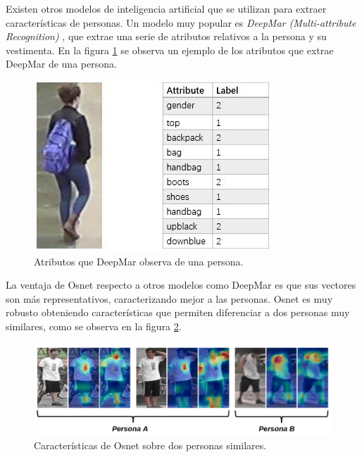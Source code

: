 
\newpage

Existen otros modelos de inteligencia artificial que se utilizan para extraer características de personas. Un modelo muy popular es \textit{DeepMar (Multi-attribute Recognition)} \citep{DEEPMAR}, que extrae una serie de atributos relativos a la persona y su vestimenta. En la figura \ref{fig:deepmar} se observa un ejemplo de los atributos que extrae DeepMar de una persona.

\begin{figure}[ht]
	\centering
	\includegraphics[scale=.8]{./Figures/deepmar.png}
	\caption{Atributos que DeepMar observa de una persona\protect\footnotemark.}
	\label{fig:deepmar}
\end{figure}


La ventaja de Osnet respecto a otros modelos como DeepMar es que sus vectores son más representativos, caracterizando mejor a las personas. Osnet es muy robusto obteniendo características que permiten diferenciar a dos personas muy similares, como se observa en la figura \ref{fig:osnetDosPersonas}.

\begin{figure}[ht]
	\centering
	\includegraphics[scale=0.5]{./Figures/osnetDosPersonas.png}
	\caption{Características de Osnet sobre dos personas similares\protect\footnotemark.}
	\label{fig:osnetDosPersonas}
\end{figure}

